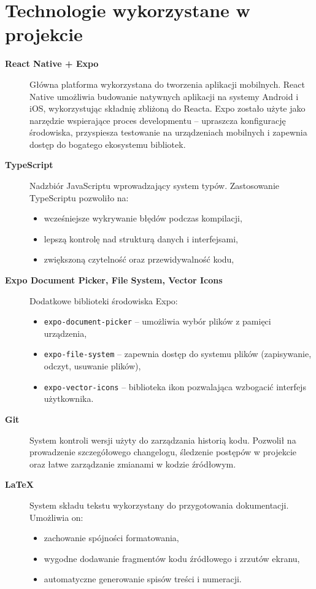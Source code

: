 \documentclass[12pt,a4paper]{article}
\begin{document}
\section{Technologie wykorzystane w projekcie}

\begin{description}
    \item[\textbf{React Native + Expo}] 
    Główna platforma wykorzystana do tworzenia aplikacji mobilnych. 
    React Native umożliwia budowanie natywnych aplikacji na systemy Android i iOS, wykorzystując składnię zbliżoną do Reacta. 
    Expo zostało użyte jako narzędzie wspierające proces developmentu – upraszcza konfigurację środowiska, przyspiesza testowanie na urządzeniach mobilnych i zapewnia dostęp do bogatego ekosystemu bibliotek.

    \item[\textbf{TypeScript}] 
    Nadzbiór JavaScriptu wprowadzający system typów. 
    Zastosowanie TypeScriptu pozwoliło na: 
    \begin{itemize}
        \item wcześniejsze wykrywanie błędów podczas kompilacji,
        \item lepszą kontrolę nad strukturą danych i interfejsami,
        \item zwiększoną czytelność oraz przewidywalność kodu,
    \end{itemize}

    \item[\textbf{Expo Document Picker, File System, Vector Icons}] 
    Dodatkowe biblioteki środowiska Expo: 
    \begin{itemize}
        \item \texttt{expo-document-picker} – umożliwia wybór plików z pamięci urządzenia, 
        \item \texttt{expo-file-system} – zapewnia dostęp do systemu plików (zapisywanie, odczyt, usuwanie plików),
        \item \texttt{expo-vector-icons} – biblioteka ikon pozwalająca wzbogacić interfejs użytkownika.
    \end{itemize}

    \item[\textbf{Git}] 
    System kontroli wersji użyty do zarządzania historią kodu. 
    Pozwolił na prowadzenie szczegółowego changelogu, śledzenie postępów w projekcie oraz łatwe zarządzanie zmianami w kodzie źródłowym.

    \item[\textbf{LaTeX}] 
    System składu tekstu wykorzystany do przygotowania dokumentacji. 
    Umożliwia on: 
    \begin{itemize}
        \item zachowanie spójności formatowania,
        \item wygodne dodawanie fragmentów kodu źródłowego i zrzutów ekranu,
        \item automatyczne generowanie spisów treści i numeracji.
    \end{itemize}
\end{description}
\end{document}
